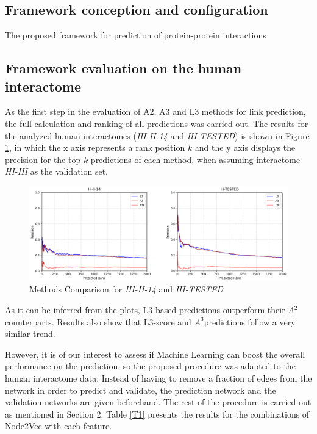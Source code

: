 
\subsection*{Framework conception and configuration}

The proposed framework for prediction of protein-protein interactions


\subsection*{Framework evaluation on the human interactome}

As the first step in the evaluation of A2, A3 and L3 methods for link
prediction, the full calculation and ranking of all predictions was
carried out. The results for the analyzed human interactomes (\emph{HI-II-14}
and \emph{HI-TESTED}) is shown in Figure \ref{fig:HI1}, in which
the x axis represents a rank position $k$ and the y axis displays
the precision for the top $k$ predictions of each method, when assuming
interactome \emph{HI-III} as the validation set. 
	
\begin{figure}[h]
\caption{\label{fig:HI1}Methods Comparison for \emph{HI-II-14} and \emph{HI-TESTED}}
	\includegraphics[width=\textwidth ]{figures/figure2.eps}
\end{figure}

As it can be inferred from the plots, L3-based predictions outperform
their $A{{}^2}$ counterparts. Results also show that L3-score and
$A^{3}$predictions follow a very similar trend.

However, it is of our interest to assess if Machine Learning can boost
the overall performance on the prediction, so the proposed procedure
was adapted to the human interactome data: Instead of having to remove
a fraction of edges from the network in order to predict and validate,
the prediction network and the validation networks are given beforehand.
The rest of the procedure is carried out as mentioned in Section 2.
Table \ref{T1} presents the results for the combinations of Node2Vec
with each feature.

